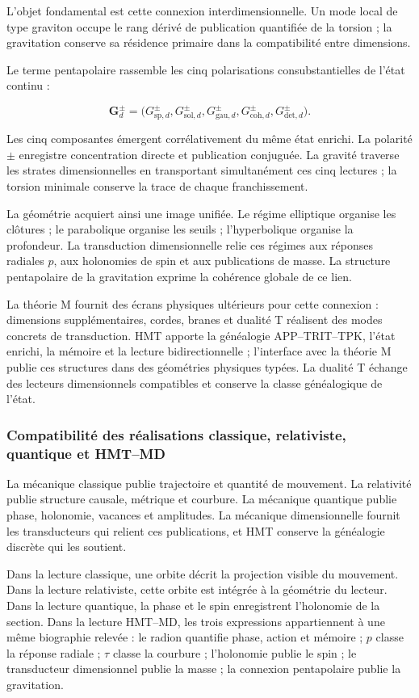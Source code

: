 L'objet fondamental est cette connexion interdimensionnelle. Un mode local de type graviton occupe le rang dérivé de publication quantifiée de la torsion ; la gravitation conserve sa résidence primaire dans la compatibilité entre dimensions.

Le terme pentapolaire rassemble les cinq polarisations consubstantielles de l'état continu :

\[
\mathbf G_d^{\pm}
=
\bigl(
G_{\mathrm{sp},d}^{\pm},
G_{\mathrm{sol},d}^{\pm},
G_{\mathrm{gau},d}^{\pm},
G_{\mathrm{coh},d}^{\pm},
G_{\mathrm{det},d}^{\pm}
\bigr).
\]

Les cinq composantes émergent corrélativement du même état enrichi. La polarité \(\pm\) enregistre concentration directe et publication conjuguée. La gravité traverse les strates dimensionnelles en transportant simultanément ces cinq lectures ; la torsion minimale conserve la trace de chaque franchissement.

La géométrie acquiert ainsi une image unifiée. Le régime elliptique organise les clôtures ; le parabolique organise les seuils ; l'hyperbolique organise la profondeur. La transduction dimensionnelle relie ces régimes aux réponses radiales \(p\), aux holonomies de spin et aux publications de masse. La structure pentapolaire de la gravitation exprime la cohérence globale de ce lien.

La théorie M fournit des écrans physiques ultérieurs pour cette connexion : dimensions supplémentaires, cordes, branes et dualité T réalisent des modes concrets de transduction. HMT apporte la généalogie APP–TRIT–TPK, l'état enrichi, la mémoire et la lecture bidirectionnelle ; l'interface avec la théorie M publie ces structures dans des géométries physiques typées. La dualité T échange des lecteurs dimensionnels compatibles et conserve la classe généalogique de l'état.

\subsubsection{Compatibilité des réalisations classique, relativiste, quantique et HMT--MD}

La mécanique classique publie trajectoire et quantité de mouvement. La relativité publie structure causale, métrique et courbure. La mécanique quantique publie phase, holonomie, vacances et amplitudes. La mécanique dimensionnelle fournit les transducteurs qui relient ces publications, et HMT conserve la généalogie discrète qui les soutient.

Dans la lecture classique, une orbite décrit la projection visible du mouvement. Dans la lecture relativiste, cette orbite est intégrée à la géométrie du lecteur. Dans la lecture quantique, la phase et le spin enregistrent l'holonomie de la section. Dans la lecture HMT–MD, les trois expressions appartiennent à une même biographie relevée : le radion quantifie phase, action et mémoire ; \(p\) classe la réponse radiale ; \(\tau\) classe la courbure ; l'holonomie publie le spin ; le transducteur dimensionnel publie la masse ; la connexion pentapolaire publie la gravitation.

